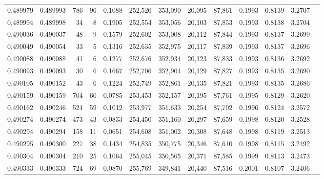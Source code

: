 \begin{tabular}{rrrrrrrrrrrrr}
0.489979 & 0.489993 &   786 &    96 &                                     0.1088 & 252,520 & 353,090 &  20,095 &  87,861 & 0.1993 & 0.8139 & 3.2707 \\
0.489994 & 0.489998 &    34 &     8 &                                     0.1905 & 252,554 & 353,056 &  20,103 &  87,853 & 0.1993 & 0.8138 & 3.2704 \\
0.490036 & 0.490037 &    48 &     9 &                                     0.1579 & 252,602 & 353,008 &  20,112 &  87,844 & 0.1993 & 0.8137 & 3.2699 \\
0.490049 & 0.490054 &    33 &     5 &                                     0.1316 & 252,635 & 352,975 &  20,117 &  87,839 & 0.1993 & 0.8137 & 3.2696 \\
0.490088 & 0.490088 &    41 &     6 &                                     0.1277 & 252,676 & 352,934 &  20,123 &  87,833 & 0.1993 & 0.8136 & 3.2692 \\
0.490093 & 0.490093 &    30 &     6 &                                     0.1667 & 252,706 & 352,904 &  20,129 &  87,827 & 0.1993 & 0.8135 & 3.2690 \\
0.490105 & 0.490152 &    43 &     6 &                                     0.1224 & 252,749 & 352,861 &  20,135 &  87,821 & 0.1993 & 0.8135 & 3.2686 \\
0.490159 & 0.490159 &   704 &    60 &                                     0.0785 & 253,453 & 352,157 &  20,195 &  87,761 & 0.1995 & 0.8129 & 3.2620 \\
0.490162 & 0.490246 &   524 &    59 &                                     0.1012 & 253,977 & 351,633 &  20,254 &  87,702 & 0.1996 & 0.8124 & 3.2572 \\
0.490274 & 0.490274 &   473 &    43 &                                     0.0833 & 254,450 & 351,160 &  20,297 &  87,659 & 0.1998 & 0.8120 & 3.2528 \\
0.490294 & 0.490294 &   158 &    11 &                                     0.0651 & 254,608 & 351,002 &  20,308 &  87,648 & 0.1998 & 0.8119 & 3.2513 \\
0.490295 & 0.490300 &   227 &    38 &                                     0.1434 & 254,835 & 350,775 &  20,346 &  87,610 & 0.1998 & 0.8115 & 3.2492 \\
0.490304 & 0.490304 &   210 &    25 &                                     0.1064 & 255,045 & 350,565 &  20,371 &  87,585 & 0.1999 & 0.8113 & 3.2473 \\
0.490333 & 0.490333 &   724 &    69 &                                     0.0870 & 255,769 & 349,841 &  20,440 &  87,516 & 0.2001 & 0.8107 & 3.2406 \\

\end{tabular}
